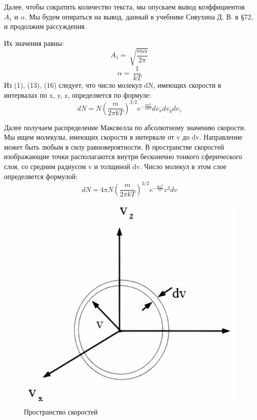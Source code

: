 \documentclass[a4paper,12pt]{article}
\begin{document}
Далее, чтобы сократить количество текста, мы опускаем вывод коэффициентов $A_1$ и $\alpha$. Мы будем опираться на вывод, данный в учебнике Сивухина Д. В. в §72, и продолжим рассуждения.

Их значения равны:
\begin{equation}
A_1=\ \sqrt{\frac{m\alpha}{2\pi}}
\end{equation}
\begin{equation}
\alpha=\ \frac{1}{kT}
\end{equation}
Из (1), (13), (16) следует, что число молекул dN, имеющих скорости в интервалах по x, y, z, определяется по формуле:
\begin{equation}
dN=N\left(\frac{m}{2\pi kT}\right)^{3/2}e^{-\frac{mv^2}{\alpha kT}}dv_xdv_ydv_z\end{equation}

Далее получаем распределение Максвелла по абсолютному значению скорости. Мы ищем молекулы, имеющих скорости в интервале от v до dv. Направление может быть любым в силу равновероятности. В пространстве скоростей изображающие точки располагаются внутри бесконечно тонкого сферического слоя, со средним радиусом v и толщиной dv. Число молекул в этом слое определяется формулой:
\begin{equation}
dN=4\pi N{\left(\frac{m}{2\pi kT} \right) }^{3/2}e^{-\frac{mv^2}{kT}}v^2dv
\end{equation}
\begin{figure}[h!]
	\begin{center}
		\includegraphics[scale=0.33]{1}
	\end{center}
	\caption{Пространство скоростей}
\end{figure}	
\end{document}
